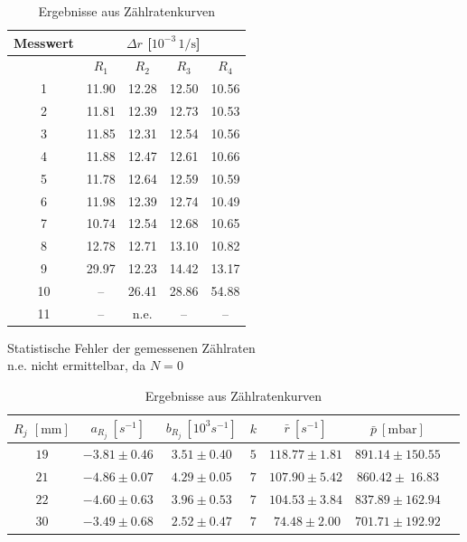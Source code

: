 \documentclass[12pt,a4paper]{scrartcl}
\numberwithin{equation}{section} %
\begin{document}
\begin{table}[H]
	\centering
	\begin{tabular}{||c|c|c|c|c||}
		\hline
		Messwert & \multicolumn{4}{c||}{$\Delta r$ [$10^{-3} \mathrm{\, 1/s}$]} \\
		\hline
		& $R_1$ & $R_2$ & $R_3$ & $R_4$ \\
		\hline \hline
		1 & 11.90 & 12.28 & 12.50 & 10.56\\
		\hline
		2 & 11.81 & 12.39 & 12.73 & 10.53\\
		\hline
		3 & 11.85 & 12.31 & 12.54 & 10.56\\
		\hline
		4 & 11.88 & 12.47 & 12.61 & 10.66\\
		\hline
		5 & 11.78 & 12.64 & 12.59 & 10.59\\
		\hline
		6 & 11.98 & 12.39 & 12.74 & 10.49\\
		\hline
		7 & 10.74 & 12.54 & 12.68 & 10.65\\
		\hline
		8 & 12.78 & 12.71 & 13.10 & 10.82\\
		\hline
		9 & 29.97 & 12.23 & 14.42 & 13.17\\
		\hline
		10 & -- & 26.41 & 28.86 & 54.88\\
		\hline
		11 & -- & n.e. & -- & --\\
		\hline
	\end{tabular}
	\caption{Statistische Fehler der gemessenen Zählraten\\
		n.e. nicht ermittelbar, da $N = 0$}
	\label{table_statistische_fehler}
	\vspace{12pt}

	\begin{tabular}{||c|c|c|c|c|c|c||}
		\hline
		$R_j$ $[\mathrm{mm}]$
			& $a_{R_j}\ [s^{-1}]$
			& $b_{R_j}\ [10^3 s^{-1}]$
			& $k$
			& $\bar{r}\ [s^{-1}]$
			& $\bar{p}\ [\mathrm{mbar}]$ \\
		\hline \hline
		$19$
			& $-3.81 \pm 0.46$
			& $3.51 \pm 0.40$
			& $5$
			& $118.77 \pm 1.81$
			& $891.14 \pm 150.55$ \\
		\hline
		$21$
			& $-4.86 \pm 0.07$
			& $4.29 \pm 0.05$
			& $7$
			& $107.90 \pm 5.42$
			& $860.42 \pm \ 16.83$ \\
		\hline
		$22$
			& $-4.60 \pm 0.63$
			& $3.96 \pm 0.53$
			& $7$
			& $104.53 \pm 3.84$
			& $837.89 \pm 162.94$ \\
		\hline
		$30$
			& $-3.49 \pm 0.68$
			& $2.52 \pm 0.47$
			& $7$
			& $\ 74.48 \pm 2.00$
			& $701.71 \pm 192.92$ \\
		\hline
	\end{tabular}
	\caption{Ergebnisse aus Zählratenkurven}
	\label{table_messwerte_zählrate}
\end{table}
\end{document}
